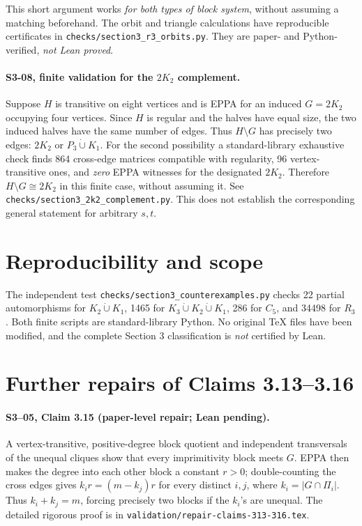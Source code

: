 \documentclass{article}
\begin{document}
This short argument works \emph{for both types of block
system}, without assuming a matching beforehand.
The orbit and triangle calculations have reproducible
certificates in \texttt{checks/section3\_r3\_orbits.py}.
They are paper- and Python-verified, \emph{not Lean proved}.

\paragraph{S3-08, finite validation for the \(2K_2\) complement.}
Suppose \(H\) is transitive on eight vertices and is EPPA
for an induced \(G=2K_2\) occupying four vertices.
Since \(H\) is regular and the halves have equal size,
the two induced halves have the same number of edges.
Thus \(H\setminus G\) has precisely two edges:
\(2K_2\) or \(P_3\dot\cup K_1\).
For the second possibility a standard-library exhaustive
check finds 864 cross-edge matrices compatible with regularity,
96 vertex-transitive ones, and \emph{zero} EPPA witnesses
for the designated \(2K_2\). Therefore \(H\setminus G
\cong2K_2\) in this finite case, without assuming it.
See \texttt{checks/section3\_2k2\_complement.py}.
This does not establish the corresponding general statement
for arbitrary \(s,t\).
\section*{Reproducibility and scope}
The independent test \texttt{checks/section3\_counterexamples.py}
checks 22 partial automorphisms for \(K_2\dot\cup K_1\),
1465 for \(K_3\dot\cup K_2\dot\cup K_1\),
286 for \(C_5\), and 34498 for \(R_3\). Both finite
scripts are standard-library Python. No original TeX files
have been modified, and the complete Section 3 classification
is \emph{not} certified by Lean.

\section*{Further repairs of Claims 3.13--3.16}
\paragraph{S3--05, Claim 3.15 (paper-level repair; Lean pending).}
A vertex-transitive, positive-degree block quotient and
independent transversals of the unequal cliques show that
every imprimitivity block meets \(G\).
EPPA then makes the degree into each other block a
constant \(r>0\); double-counting the cross edges gives
\(k_ir=(m-k_j)r\) for every distinct \(i,j\), where
\(k_i=|G\cap\Pi_i|\). Thus \(k_i+k_j=m\), forcing
precisely two blocks if the \(k_i\)'s are unequal.
The detailed rigorous proof is in
\texttt{validation/repair-claims-313-316.tex}.
\end{document}

